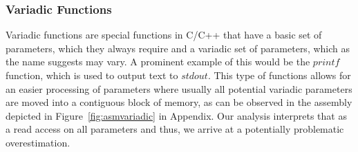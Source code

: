 \subsubsection{Variadic Functions}
\label{subsection:variadicfunctions}
Variadic functions are special functions in C/C++ that have a basic set of parameters, 
which they always require and a variadic set of parameters, which as the name suggests 
may vary. A prominent example of this would be the $printf$ function, which is used 
to output text to $stdout$.
This type of functions allows for an easier processing of parameters where
usually all potential variadic parameters are moved into a contiguous block of memory, 
as can be observed in the assembly depicted in Figure~\ref{fig:asmvariadic} in Appendix.
Our analysis interprets that as a read access on all parameters and thus,
we arrive at a potentially problematic overestimation. 



